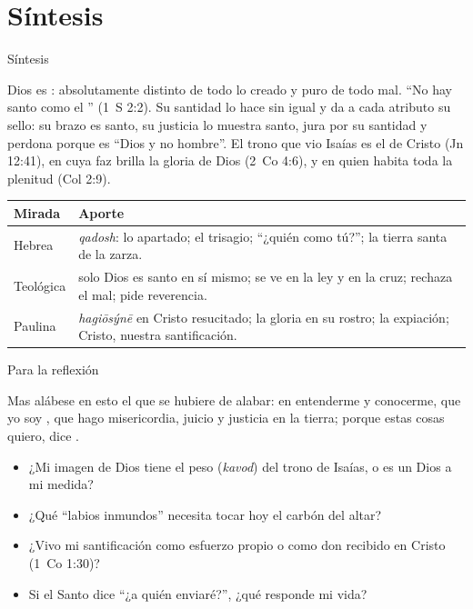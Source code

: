 \section{Síntesis}

\begin{frame}{Síntesis}
\begin{tcolorbox}[colback=papiro,colframe=azul,boxrule=1pt,arc=3pt]
\small Dios es : absolutamente distinto de todo lo creado y puro de todo mal. ``No hay santo como el \SENOR'' (1~S 2:2). Su santidad lo hace sin igual y da a cada atributo su sello: su brazo es santo, su justicia lo muestra santo, jura por su santidad y perdona porque es ``Dios y no hombre''. El trono que vio Isaías es el de Cristo (Jn 12:41), en cuya faz brilla la gloria de Dios (2~Co 4:6), y en quien habita toda la plenitud (Col 2:9).
\end{tcolorbox}
\scriptsize\renewcommand{\arraystretch}{1.2}
\begin{tabular}{@{}>{\RaggedRight\arraybackslash}p{2.4cm}>{\RaggedRight\arraybackslash}p{9.4cm}@{}}
\toprule
\textbf{Mirada} & \textbf{Aporte} \\ \midrule
Hebrea & \emph{qadosh}: lo apartado; el trisagio; ``¿quién como tú?''; la tierra santa de la zarza. \\
Teológica & solo Dios es santo en sí mismo; se ve en la ley y en la cruz; rechaza el mal; pide reverencia. \\
Paulina & \emph{hagiōsýnē} en Cristo resucitado; la gloria en su rostro; la expiación; Cristo, nuestra santificación. \\
\bottomrule
\end{tabular}
\end{frame}

\begin{frame}{Para la reflexión}
\begin{cita}Mas alábese en esto el que se hubiere de alabar: en entenderme y conocerme, que yo soy \SENOR, que hago misericordia, juicio y justicia en la tierra; porque estas cosas quiero, dice \SENOR.\end{cita}
\small
\begin{itemize}
\item ¿Mi imagen de Dios tiene el peso (\emph{kavod}) del trono de Isaías, o es un Dios a mi medida?
\item ¿Qué ``labios inmundos'' necesita tocar hoy el carbón del altar?
\item ¿Vivo mi santificación como esfuerzo propio o como don recibido en Cristo (1~Co 1:30)?
\item Si el Santo dice ``¿a quién enviaré?'', ¿qué responde mi vida?
\end{itemize}
\end{frame}

